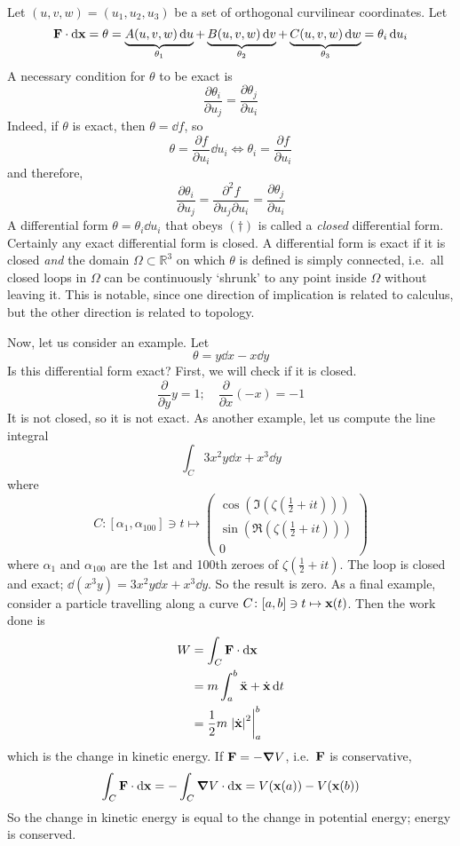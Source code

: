 Let \((u, v, w) = (u_1, u_2, u_3)\) be a set of orthogonal curvilinear coordinates.
Let
\[
	\vb F \cdot \dd \vb x = \theta = \underbrace{A(u, v, w) \dd{u}}_{\theta_1} + \underbrace{B(u, v, w) \dd{v}}_{\theta_2} + \underbrace{C(u, v, w) \dd{w}}_{\theta_3} = \theta_i \dd{u}_i
\]
A necessary condition for \(\theta\) to be exact is
\begin{equation}
	\frac{\partial \theta_i}{\partial u_j} = \frac{\partial \theta_j}{\partial u_i}
	\tag{\(\dagger\)}
\end{equation}
Indeed, if \(\theta\) is exact, then \(\theta = \dd{f}\), so
\[
	\theta = \frac{\partial f}{\partial u_i} \dd{u}_i \iff \theta_i = \frac{\partial f}{\partial u_i}
\]
and therefore,
\[
	\frac{\partial \theta_i}{\partial u_j} = \frac{\partial^2 f}{\partial u_j \partial u_i} = \frac{\partial \theta_j}{\partial u_i}
\]
A differential form \(\theta = \theta_i \dd{u}_i\) that obeys \((\dagger)\) is called a \textit{closed} differential form.
Certainly any exact differential form is closed.
A differential form is exact if it is closed \textit{and} the domain \(\Omega \subset \mathbb R^3\) on which \(\theta\) is defined is simply connected, i.e.\ all closed loops in \(\Omega\) can be continuously `shrunk' to any point inside \(\Omega\) without leaving it.
This is notable, since one direction of implication is related to calculus, but the other direction is related to topology.

Now, let us consider an example.
Let
\[
	\theta = y \dd{x} - x \dd{y}
\]
Is this differential form exact?
First, we will check if it is closed.
\[
	\frac{\partial}{\partial y} y = 1;\quad \frac{\partial}{\partial x} (-x) = -1
\]
It is not closed, so it is not exact.
As another example, let us compute the line integral
\[
	\int_C 3x^2y\dd{x} + x^3\dd{y}
\]
where
\[
	C \colon [\alpha_1, \alpha_{100}] \ni t \mapsto \begin{pmatrix}
		\cos \left( \Im \left( \zeta \left( \frac{1}{2} + it \right) \right) \right) \\
		\sin \left( \Re \left( \zeta \left( \frac{1}{2} + it \right) \right) \right) \\
		0
	\end{pmatrix}
\]
where \(\alpha_1\) and \(\alpha_{100}\) are the 1st and 100th zeroes of \(\zeta \left( \frac{1}{2} + it \right)\).
The loop is closed and exact; \(\dd(x^3 y) = 3x^2 y \dd{x} + x^3 \dd{y}\).
So the result is zero.
As a final example, consider a particle travelling along a curve \(C \colon [a, b] \ni t \mapsto \vb x(t)\).
Then the work done is
\begin{align*}
	W & = \int_C \vb F \cdot \dd \vb x                 \\
	  & = m \int_a^b \ddot{\vb x} + \dot{\vb x} \dd{t} \\
	  & = \frac{1}{2}m \eval{\abs{\dot{\vb x}}^2}_a^b
\end{align*}
which is the change in kinetic energy.
If \(\vb F = -\grad V\), i.e.\ \(\vb F\) is conservative,
\[
	\int_C \vb F \cdot \dd \vb x = -\int_C \grad V \cdot \dd \vb x = V(\vb x(a)) - V(\vb x(b))
\]
So the change in kinetic energy is equal to the change in potential energy; energy is conserved.
